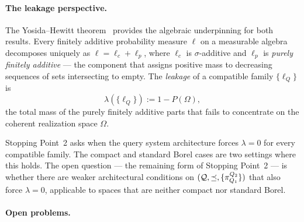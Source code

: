 \paragraph{The leakage perspective.}
The Yosida--Hewitt theorem~\cite{Dunford1958} provides the
algebraic underpinning for both results.  Every finitely additive
probability measure $\ell$ on a measurable algebra decomposes
uniquely as $\ell = \ell_c + \ell_p$, where $\ell_c$ is
$\sigma$-additive and $\ell_p$ is \emph{purely finitely additive}
--- the component that assigns positive mass to decreasing sequences
of sets intersecting to empty.  The \emph{leakage} of a compatible
family $\{\ell_Q\}$ is
\[
\lambda(\{\ell_Q\}) := 1 - P(\Omega),
\]
the total mass of the purely finitely additive parts that fails to
concentrate on the coherent realization space $\Omega$.

Stopping Point~2 asks when the query system architecture forces
$\lambda = 0$ for every compatible family.  The compact and standard
Borel cases are two settings where this holds.  The open question ---
the remaining form of Stopping Point~2 --- is whether there are
weaker architectural conditions on $(\mathcal{Q}, \preceq,
\{\pi^{Q_2}_{Q_1}\})$ that also force $\lambda = 0$, applicable
to spaces that are neither compact nor standard Borel.

\paragraph{Open problems.}


